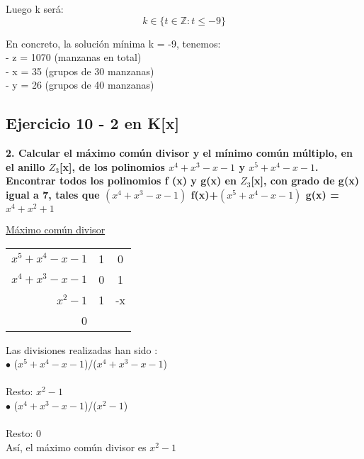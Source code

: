 \documentclass[11pt, a4paper, titlepage]{article}
\providecommand{\ent}{\mathbb{Z}}
\begin{document}
Luego k será:
$$ k \in \{ t \in \ent : t \leq -9 \} $$

En concreto, la solución mínima k = -9, tenemos: \\
- z = 1070 (manzanas en total) \\
- x = 35 (grupos de 30 manzanas) \\
- y = 26 (grupos de 40 manzanas) \\

	\subsection{\LARGE{Ejercicio 10 - 2 en K[x]}}
	\textbf{2. Calcular el máximo común divisor y el mínimo común múltiplo, en el anillo $Z_{3}$[x], de los polinomios $x^{4}+x^{3}-x-1$ y $x^{5}+x^{4} -x-1$. Encontrar todos los polinomios f (x) y g(x) en $Z_{3}$[x], con grado de g(x) igual a 7, tales que $(x^{4}+x^{3}-x-1)$ f(x)+$(x^{5}+x^{4} -x-1)$ g(x) = $x^{4}+x^{2}+1$ \\ }
	
	
     \underline{Máximo común divisor} \\
     
	\begin{center}
	\begin{tabular}{r|cc}
	$x^{5}+x^{4} -x-1$ & 1 & 0 \\
	$x^{4}+x^{3}-x-1$ & 0 & 1 \\
	$x^{2}-1$ & 1 & -x \\
	0
	\end{tabular}
	\end{center}
     
     Las divisiones realizadas han sido : \\
     
     $\bullet$ ($x^{5}+x^{4} -x-1$)/($x^{4}+x^{3}-x-1$) \\
     
      \\
     Resto:  $x^{2}-1 $\\
     
     $\bullet$ ($x^{4}+x^{3}-x-1$)/($x^{2}-1 $) \\
     
       \\
      Resto:  0\\
      
      Así, el máximo común divisor es $x^{2}-1$ \\
     
\end{document}
